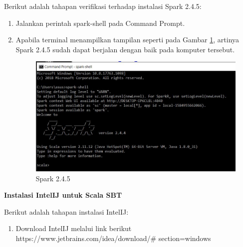 \documentclass[a4paper,twoside]{article}
\begin{document}
\begin{enumerate}
\noindent Berikut adalah tahapan verifikasi terhadap instalasi Spark 2.4.5:
\begin{enumerate}
\item Jalankan perintah \textsf{spark-shell} pada Command Prompt.

\item Apabila terminal menampilkan tampilan seperti pada Gambar \ref{fig:spark_instal_7}, artinya Spark 2.4.5 sudah dapat berjalan dengan baik pada komputer tersebut.

\begin{figure}[H]
	\centering
	\includegraphics[scale=0.55]{spark_instal_7}
	\caption{Spark 2.4.5}
	\label{fig:spark_instal_7}
\end{figure}

\end{enumerate}

\textbf{Instalasi IntelIJ untuk Scala SBT}

Berikut adalah tahapan instalasi IntelIJ:

\begin{enumerate}
\item Download IntelIJ melalui link berikut \\
\textsf{https://www.jetbrains.com/idea/download/\# section=windows}


\end{enumerate}
\end{enumerate}
\end{document}
